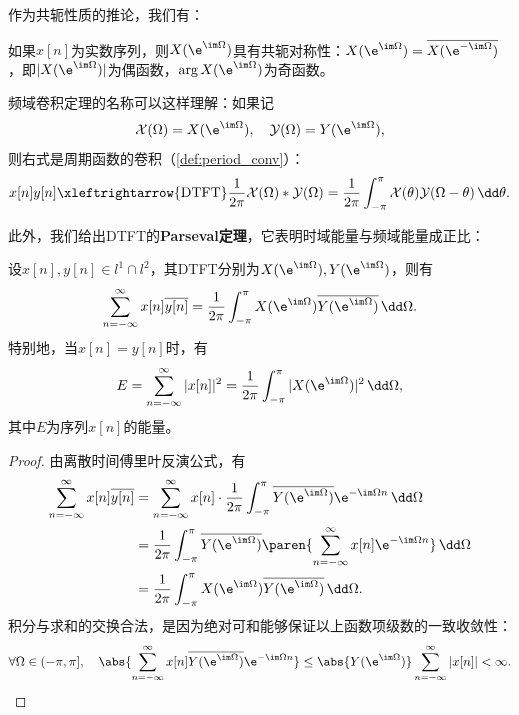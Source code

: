 作为共轭性质的推论，我们有：
\begin{corollary}
    如果$x[n]$为实数序列，则$X(\e^{\im\Omega})$具有共轭对称性：$X(\e^{\im\Omega})=\overline{X(\e^{-\im\Omega})}$，即$|X(\e^{\im\Omega})|$为偶函数，$\arg X(\e^{\im\Omega})$为奇函数。
\end{corollary}

频域卷积定理的名称可以这样理解：如果记
\begin{equation}
    \mathcal{X}(\Omega)=X(\e^{\im\Omega}),\quad \mathcal{Y}(\Omega)=Y(\e^{\im\Omega}),
\end{equation}
则右式是周期函数的卷积（\cref{def:period_conv}）：
\begin{equation}
    x[n]y[n]\xleftrightarrow{\mathrm{DTFT}}\frac{1}{2\pi}\mathcal{X}(\Omega)*\mathcal{Y}(\Omega)=\frac{1}{2\pi}\int_{-\pi}^{\pi}\mathcal{X}(\theta)\mathcal{Y}(\Omega-\theta)\,\dd\theta.
\end{equation}

此外，我们给出DTFT的\textbf{Parseval定理}，它表明时域能量与频域能量成正比：
\begin{theorem}[离散时间傅里叶变换的Parseval定理]\label{thm:DTFT_plancherel}
    设$x[n],y[n]\in l^1\cap l^2$，其DTFT分别为$X(\e^{\im\Omega}),Y(\e^{\im\Omega})$，则有
    \begin{equation}
        \sum_{n=-\infty}^{\infty}x[n]\overline{y[n]}=\frac{1}{2\pi}\int_{-\pi}^{\pi}X(\e^{\im\Omega})\overline{Y(\e^{\im\Omega})}\,\dd\Omega.
    \end{equation}
    特别地，当$x[n]=y[n]$时，有
    \begin{equation}
        E=\sum_{n=-\infty}^{\infty}|x[n]|^2=\frac{1}{2\pi}\int_{-\pi}^{\pi}|X(\e^{\im\Omega})|^2\,\dd\Omega,
    \end{equation}
    其中$E$为序列$x[n]$的能量。
\end{theorem}
\begin{proof}
    由离散时间傅里叶反演公式，有
    \begin{align}
        \sum_{n=-\infty}^{\infty}x[n]\overline{y[n]}&=\sum_{n=-\infty}^{\infty}x[n]\cdot\frac{1}{2\pi}\int_{-\pi}^{\pi}\overline{Y(\e^{\im\Omega})}\e^{-\im\Omega n}\,\dd\Omega \nonumber \\
        &=\frac{1}{2\pi}\int_{-\pi}^{\pi}\overline{Y(\e^{\im\Omega})}\paren{\sum_{n=-\infty}^{\infty}x[n]\e^{-\im\Omega n}}\,\dd\Omega \nonumber \\
        &=\frac{1}{2\pi}\int_{-\pi}^{\pi}X(\e^{\im\Omega})\overline{Y(\e^{\im\Omega})}\,\dd\Omega.
    \end{align}
    积分与求和的交换合法，是因为绝对可和能够保证以上函数项级数的一致收敛性：
    \begin{equation}
        \forall\Omega\in(-\pi,\pi],\quad \abs{\sum_{n=-\infty}^{\infty}x[n]\overline{Y(\e^{\im\Omega})}\e^{-\im\Omega n}}\leq\abs{Y(\e^{\im\Omega})}\sum_{n=-\infty}^{\infty}|x[n]|<\infty.
    \end{equation}
\end{proof}

